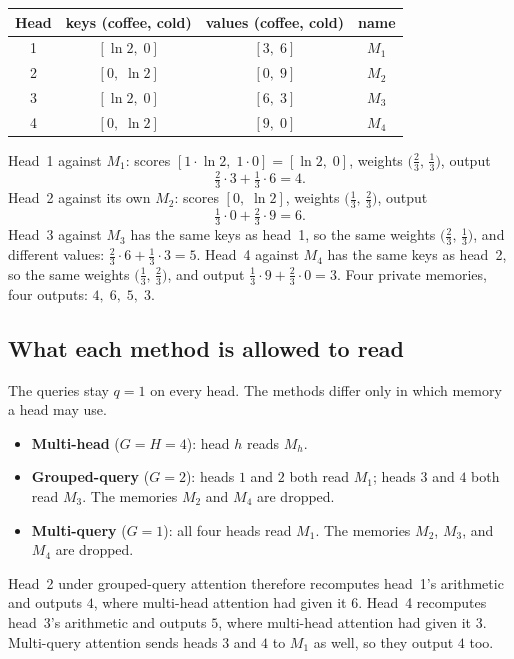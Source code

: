 \documentclass[11pt]{article}
\begin{document}
\begin{center}
\small
\begin{tabular}{@{}cccc@{}}
\toprule
Head & keys (coffee, cold) & values (coffee, cold) & name \\
\midrule
1 & \([\ln 2,\; 0]\) & \([3,\; 6]\) & \(M_1\) \\
2 & \([0,\; \ln 2]\) & \([0,\; 9]\) & \(M_2\) \\
3 & \([\ln 2,\; 0]\) & \([6,\; 3]\) & \(M_3\) \\
4 & \([0,\; \ln 2]\) & \([9,\; 0]\) & \(M_4\) \\
\bottomrule
\end{tabular}
\end{center}

Head~1 against \(M_1\): scores \([1\cdot\ln 2,\; 1\cdot 0]=[\ln 2,\; 0]\),
weights \(\bigl(\tfrac{2}{3},\,\tfrac{1}{3}\bigr)\), output
\[
  \tfrac{2}{3}\cdot 3 + \tfrac{1}{3}\cdot 6 = 4.
\]
Head~2 against its own \(M_2\): scores \([0,\;\ln 2]\), weights
\(\bigl(\tfrac{1}{3},\,\tfrac{2}{3}\bigr)\), output
\[
  \tfrac{1}{3}\cdot 0 + \tfrac{2}{3}\cdot 9 = 6.
\]
Head~3 against \(M_3\) has the same keys as head~1, so the same weights
\(\bigl(\tfrac{2}{3},\,\tfrac{1}{3}\bigr)\), and different values:
\(\tfrac{2}{3}\cdot 6 + \tfrac{1}{3}\cdot 3 = 5\).
Head~4 against \(M_4\) has the same keys as head~2, so the same weights
\(\bigl(\tfrac{1}{3},\,\tfrac{2}{3}\bigr)\), and output
\(\tfrac{1}{3}\cdot 9 + \tfrac{2}{3}\cdot 0 = 3\).
Four private memories, four outputs: \(4,\;6,\;5,\;3\).

\subsection{What each method is allowed to read}

The queries stay \(q=1\) on every head. The methods differ only in which
memory a head may use.
\begin{itemize}[leftmargin=*]
  \item \textbf{Multi-head} (\(G=H=4\)): head \(h\) reads \(M_h\).
  \item \textbf{Grouped-query} (\(G=2\)): heads \(1\) and \(2\) both read
        \(M_1\); heads \(3\) and \(4\) both read \(M_3\). The memories
        \(M_2\) and \(M_4\) are dropped.
  \item \textbf{Multi-query} (\(G=1\)): all four heads read \(M_1\).
        The memories \(M_2\), \(M_3\), and \(M_4\) are dropped.
\end{itemize}
Head~2 under grouped-query attention therefore recomputes head~1's
arithmetic and outputs \(4\), where multi-head attention had given it
\(6\). Head~4 recomputes head~3's arithmetic and outputs \(5\), where
multi-head attention had given it \(3\). Multi-query attention sends heads
\(3\) and \(4\) to \(M_1\) as well, so they output \(4\) too.
\end{document}
